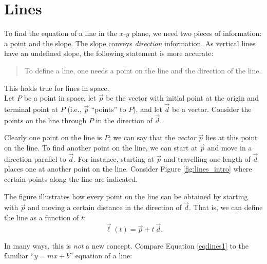 \section{Lines}\label{sec:lines}

To find the equation of a line in the $x$-$y$ plane, we need two pieces of information: a point and the slope. The slope conveys \textit{direction} information. As vertical lines have an undefined slope, the following statement is more accurate:

\begin{quotation}
\noindent To define a line, one needs a point on the line and the direction of the line.
\end{quotation}

This holds true for lines in space.\\

Let $P$ be a point in space, let $\vec p$ be the vector with initial point at the origin and terminal point at $P$ (i.e., $\vec p$ ``points'' to $P$), and let $\vec d$ be a vector. Consider the points on the line through $P$ in the direction of $\vec d$. 

Clearly one point on the line is $P$; we can say that the \emph{vector} $\vec p$ lies at this point on the line. To find another point on the line, we can start at $\vec p$ and move in a  direction parallel to $\vec d$. For instance, starting at $\vec p$ and travelling one length of $\vec d$ places one at another point on the line. Consider Figure \ref{fig:lines_intro} where certain points along the line are indicated. 

The figure illustrates how every point on the line can be obtained by starting with $\vec p$ and moving a certain distance in the direction of $\vec d$. That is, we can define the line as a function of $t$:
\begin{equation}\vec\ell(t) = \vec p + t\ \vec d.\label{eq:lines1}\end{equation}

In many ways, this is \textit{not} a new concept. Compare Equation \eqref{eq:lines1} to the familiar ``$y=mx+b$'' equation of a line:

